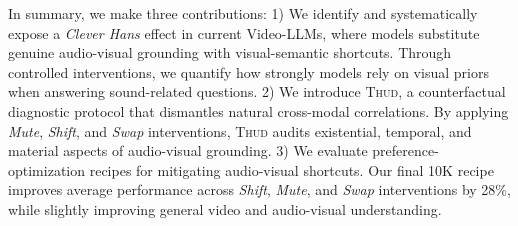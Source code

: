\documentclass{llmxive}
\providecommand{\Thud}{\textsc{Thud}\xspace}
\begin{document}

In summary, we make three contributions:
1) We identify and systematically expose a \textit{Clever Hans} effect in current Video-LLMs, where models substitute genuine audio-visual grounding with visual-semantic shortcuts. Through controlled interventions, we quantify how strongly models rely on visual priors when answering sound-related questions.
2) We introduce \Thud, a counterfactual diagnostic protocol that dismantles natural cross-modal correlations. By applying \textit{Mute}, \textit{Shift}, and \textit{Swap} interventions, \Thud{} audits existential, temporal, and material aspects of audio-visual grounding.
3) We evaluate preference-optimization recipes for mitigating audio-visual shortcuts. Our final 10K recipe improves average performance across \textit{Shift}, \textit{Mute}, and \textit{Swap} interventions by 28\%, while slightly improving general video and audio-visual understanding.

    
    
\end{document}
